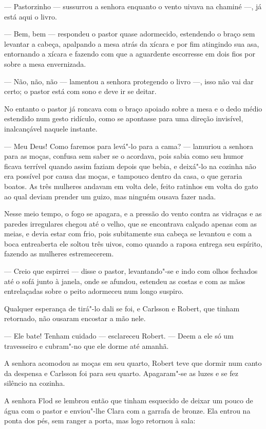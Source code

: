 --- Pastorzinho --- sussurrou a senhora enquanto o vento uivava na chaminé ---, já
está aqui o livro.

--- Bem, bem --- respondeu o pastor quase adormecido, estendendo o braço sem
levantar a cabeça, apalpando a mesa atrás da xícara e por fim atingindo 
sua asa, entornando a xícara e fazendo com que a aguardente escorresse em dois fios por
sobre a mesa envernizada.

--- Não, não, não --- lamentou a senhora protegendo o livro ---, isso não vai dar
certo; o pastor está com sono e deve ir se deitar.

No entanto o pastor já roncava com o braço apoiado sobre a mesa e o dedo médio
estendido num gesto ridículo, como se apontasse para uma direção invisível,
inalcançável naquele instante.

--- Meu Deus! Como faremos para levá"-lo para a cama? --- lamuriou a senhora para as
moças, confusa sem saber se o acordava, pois sabia como seu humor ficava
terrível quando assim faziam depois que bebia, e deixá"-lo na cozinha não era
possível por causa das moças, e tampouco dentro da casa, o que geraria boatos.
As três mulheres andavam em volta dele, feito ratinhos em volta do gato ao
qual deviam prender um guizo, mas ninguém ousava fazer nada.

Nesse meio tempo, o fogo se apagara, e a pressão do vento contra as vidraças e as
paredes irregulares chegou até o velho, que se encontrava calçado apenas com as
meias, e devia estar com frio, pois subitamente sua cabeça se levantou e com 
a boca entreaberta ele soltou três uivos, como quando a raposa entrega seu espírito,
fazendo as mulheres estremecerem.

--- Creio que espirrei --- disse o pastor, levantando"-se e indo com olhos fechados
até o sofá junto à janela, onde se afundou, estendeu as costas e com as mãos
entrelaçadas sobre o peito adormeceu num longo suspiro.

Qualquer esperança de tirá"-lo dali se foi, e Carlsson e Robert, que tinham retornado,
não ousaram encostar a mão nele.

--- Ele bate! Tenham cuidado --- esclareceu Robert. --- Deem a ele só um
travesseiro e cubram"-no que ele dorme até amanhã.

A senhora acomodou as moças em seu quarto, Robert teve que dormir num canto da
despensa e Carlsson foi para seu quarto. Apagaram"-se as luzes e se fez silêncio
na cozinha.

A senhora Flod se lembrou então que tinham esquecido de deixar um pouco de água
com o pastor e enviou"-lhe Clara com a garrafa de bronze. Ela entrou na ponta dos
pés, sem ranger a porta, mas logo retornou à sala:

